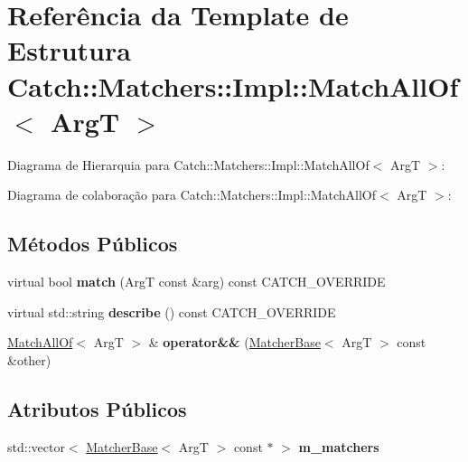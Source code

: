 \hypertarget{structCatch_1_1Matchers_1_1Impl_1_1MatchAllOf}{}\section{Referência da Template de Estrutura Catch\+:\+:Matchers\+:\+:Impl\+:\+:Match\+All\+Of$<$ ArgT $>$}
\label{structCatch_1_1Matchers_1_1Impl_1_1MatchAllOf}


Diagrama de Hierarquia para Catch\+:\+:Matchers\+:\+:Impl\+:\+:Match\+All\+Of$<$ ArgT $>$\+:


Diagrama de colaboração para Catch\+:\+:Matchers\+:\+:Impl\+:\+:Match\+All\+Of$<$ ArgT $>$\+:
\subsection*{Métodos Públicos}
\begin{DoxyCompactItemize}
\item 
virtual bool {\bfseries match} (ArgT const \&arg) const C\+A\+T\+C\+H\+\_\+\+O\+V\+E\+R\+R\+I\+DE\hypertarget{structCatch_1_1Matchers_1_1Impl_1_1MatchAllOf_a7bf0c2d8cedf67ecf9d0a527cb5a8263}{}\label{structCatch_1_1Matchers_1_1Impl_1_1MatchAllOf_a7bf0c2d8cedf67ecf9d0a527cb5a8263}

\item 
virtual std\+::string {\bfseries describe} () const C\+A\+T\+C\+H\+\_\+\+O\+V\+E\+R\+R\+I\+DE\hypertarget{structCatch_1_1Matchers_1_1Impl_1_1MatchAllOf_aaefeba99a0b35425203468a65bff544b}{}\label{structCatch_1_1Matchers_1_1Impl_1_1MatchAllOf_aaefeba99a0b35425203468a65bff544b}

\item 
\hyperlink{structCatch_1_1Matchers_1_1Impl_1_1MatchAllOf}{Match\+All\+Of}$<$ ArgT $>$ \& {\bfseries operator\&\&} (\hyperlink{structCatch_1_1Matchers_1_1Impl_1_1MatcherBase}{Matcher\+Base}$<$ ArgT $>$ const \&other)\hypertarget{structCatch_1_1Matchers_1_1Impl_1_1MatchAllOf_a3844f9fb55f7a77155576ddc1e3f90d7}{}\label{structCatch_1_1Matchers_1_1Impl_1_1MatchAllOf_a3844f9fb55f7a77155576ddc1e3f90d7}

\end{DoxyCompactItemize}
\subsection*{Atributos Públicos}
\begin{DoxyCompactItemize}
\item 
std\+::vector$<$ \hyperlink{structCatch_1_1Matchers_1_1Impl_1_1MatcherBase}{Matcher\+Base}$<$ ArgT $>$ const $\ast$ $>$ {\bfseries m\+\_\+matchers}\hypertarget{structCatch_1_1Matchers_1_1Impl_1_1MatchAllOf_a98d6a2611f195a4a5c49f92fd877be9a}{}\label{structCatch_1_1Matchers_1_1Impl_1_1MatchAllOf_a98d6a2611f195a4a5c49f92fd877be9a}

\end{DoxyCompactItemize}
